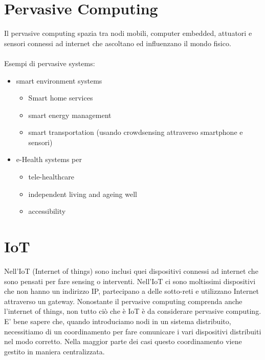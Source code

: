 \section{Pervasive Computing}
Il pervasive computing spazia tra nodi mobili, computer embedded, attuatori e sensori connessi ad internet che ascoltano ed influenzano il mondo fisico.\\
\\
Esempi di pervasive systems:
\begin{itemize}
    \item smart environment systems
    \begin{itemize}
        \item Smart home services
        \item smart energy management
        \item smart transportation (usando crowdsensing attraverso smartphone e sensori)
    \end{itemize}
    \item e-Health systems per 
    \begin{itemize}
        \item tele-healthcare
        \item independent living and ageing well
        \item accessibility
    \end{itemize}
\end{itemize}


\section{IoT}
Nell'IoT (Internet of things) sono inclusi quei dispositivi connessi ad internet che sono pensati per fare sensing o interventi. Nell'IoT ci sono moltissimi dispositivi che non hanno un indirizzo IP, partecipano a delle sotto-reti e utilizzano Internet attraverso un gateway. Nonostante il pervasive computing comprenda anche l'internet of things, non tutto ciò che è IoT è da considerare pervasive computing. E' bene sapere che, quando introduciamo nodi in un sistema distribuito, necessitiamo di un coordinamento per fare comunicare i vari dispositivi distribuiti nel modo corretto. Nella maggior parte dei casi questo coordinamento viene gestito in maniera centralizzata.

